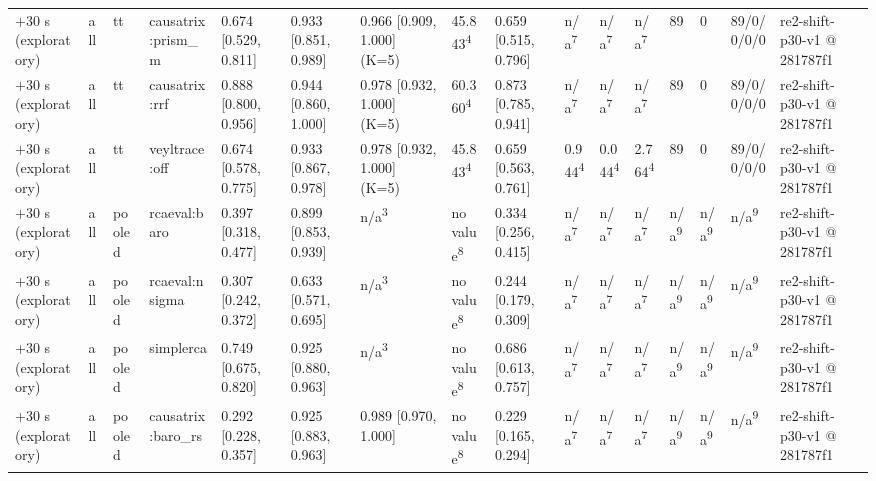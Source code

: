 \begin{table}[t]
\begin{tabular}{llllllllllllllll}
+30 s (exploratory) & all & tt & causatrix:prism\_m & 0.674 [0.529, 0.811] & 0.933 [0.851, 0.989] & 0.966 [0.909, 1.000] (K=5) & 45.843\textsuperscript{4} & 0.659 [0.515, 0.796] & n/a\textsuperscript{7} & n/a\textsuperscript{7} & n/a\textsuperscript{7} & 89 & 0 & 89/0/0/0/0 & re2-shift-p30-v1 @ 281787f1 \\
+30 s (exploratory) & all & tt & causatrix:rrf & 0.888 [0.800, 0.956] & 0.944 [0.860, 1.000] & 0.978 [0.932, 1.000] (K=5) & 60.360\textsuperscript{4} & 0.873 [0.785, 0.941] & n/a\textsuperscript{7} & n/a\textsuperscript{7} & n/a\textsuperscript{7} & 89 & 0 & 89/0/0/0/0 & re2-shift-p30-v1 @ 281787f1 \\
+30 s (exploratory) & all & tt & veyltrace:off & 0.674 [0.578, 0.775] & 0.933 [0.867, 0.978] & 0.978 [0.932, 1.000] (K=5) & 45.843\textsuperscript{4} & 0.659 [0.563, 0.761] & 0.944\textsuperscript{4} & 0.044\textsuperscript{4} & 2.764\textsuperscript{4} & 89 & 0 & 89/0/0/0/0 & re2-shift-p30-v1 @ 281787f1 \\
+30 s (exploratory) & all & pooled & rcaeval:baro & 0.397 [0.318, 0.477] & 0.899 [0.853, 0.939] & n/a\textsuperscript{3} & no value\textsuperscript{8} & 0.334 [0.256, 0.415] & n/a\textsuperscript{7} & n/a\textsuperscript{7} & n/a\textsuperscript{7} & n/a\textsuperscript{9} & n/a\textsuperscript{9} & n/a\textsuperscript{9} & re2-shift-p30-v1 @ 281787f1 \\
+30 s (exploratory) & all & pooled & rcaeval:nsigma & 0.307 [0.242, 0.372] & 0.633 [0.571, 0.695] & n/a\textsuperscript{3} & no value\textsuperscript{8} & 0.244 [0.179, 0.309] & n/a\textsuperscript{7} & n/a\textsuperscript{7} & n/a\textsuperscript{7} & n/a\textsuperscript{9} & n/a\textsuperscript{9} & n/a\textsuperscript{9} & re2-shift-p30-v1 @ 281787f1 \\
+30 s (exploratory) & all & pooled & simplerca & 0.749 [0.675, 0.820] & 0.925 [0.880, 0.963] & n/a\textsuperscript{3} & no value\textsuperscript{8} & 0.686 [0.613, 0.757] & n/a\textsuperscript{7} & n/a\textsuperscript{7} & n/a\textsuperscript{7} & n/a\textsuperscript{9} & n/a\textsuperscript{9} & n/a\textsuperscript{9} & re2-shift-p30-v1 @ 281787f1 \\
+30 s (exploratory) & all & pooled & causatrix:baro\_rs & 0.292 [0.228, 0.357] & 0.925 [0.883, 0.963] & 0.989 [0.970, 1.000] & no value\textsuperscript{8} & 0.229 [0.165, 0.294] & n/a\textsuperscript{7} & n/a\textsuperscript{7} & n/a\textsuperscript{7} & n/a\textsuperscript{9} & n/a\textsuperscript{9} & n/a\textsuperscript{9} & re2-shift-p30-v1 @ 281787f1 \\

\end{tabular}
\end{table}
